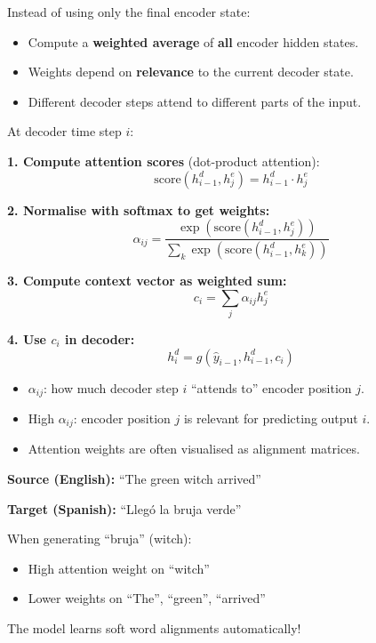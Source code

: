 \begin{defbox}
Instead of using only the final encoder state:
\begin{itemize}
  \item Compute a \textbf{weighted average} of \textbf{all} encoder hidden states.
  \item Weights depend on \textbf{relevance} to the current decoder state.
  \item Different decoder steps attend to different parts of the input.
\end{itemize}
\end{defbox}

\begin{defbox}
At decoder time step $i$:

\textbf{1. Compute attention scores} (dot-product attention):
\[
\text{score}(h^d_{i-1}, h^e_j) = h^d_{i-1} \cdot h^e_j
\]

\textbf{2. Normalise with softmax to get weights:}
\[
\alpha_{ij} = \frac{\exp(\text{score}(h^d_{i-1}, h^e_j))}{\sum_k \exp(\text{score}(h^d_{i-1}, h^e_k))}
\]

\textbf{3. Compute context vector as weighted sum:}
\[
c_i = \sum_j \alpha_{ij} h^e_j
\]

\textbf{4. Use $c_i$ in decoder:}
\[
h^d_i = g(\hat{y}_{i-1}, h^d_{i-1}, c_i)
\]
\end{defbox}

\begin{tipbox}
\begin{itemize}
  \item $\alpha_{ij}$: how much decoder step $i$ ``attends to'' encoder position $j$.
  \item High $\alpha_{ij}$: encoder position $j$ is relevant for predicting output $i$.
  \item Attention weights are often visualised as alignment matrices.
\end{itemize}
\end{tipbox}

\begin{exbox}
\textbf{Source (English):} ``The green witch arrived''

\textbf{Target (Spanish):} ``Lleg\'{o} la bruja verde''

When generating ``bruja'' (witch):
\begin{itemize}
  \item High attention weight on ``witch''
  \item Lower weights on ``The'', ``green'', ``arrived''
\end{itemize}

The model learns soft word alignments automatically!
\end{exbox}

